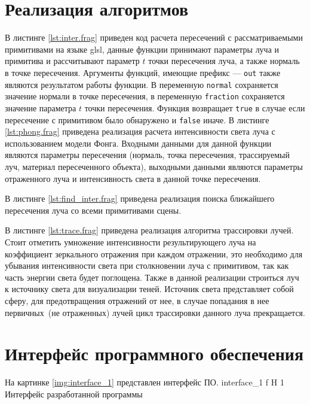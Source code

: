 \section{Реализация алгоритмов}
В листинге \ref{lst:inter.frag} приведен код расчета пересечений с рассматриваемыми примитивами на языке glsl, данные функции принимают
параметры луча и примитива  и рассчитывают параметр $t$ точки пересечения луча, а также нормаль   в точке пересечения.
Аргументы функций, имеющие префикс --- \texttt{out} также являются результатом работы функции.
В переменную \texttt{normal} сохраняется значение нормали в точке пересечения, в переменную \texttt{fraction} сохраняется 
значение параметра $t$ точки пересечения. Функция возвращает \texttt{true} в случае если пересечение с примитивом было обнаружено и \texttt{false}
иначе. 
В листинге \ref{lst:phong.frag} приведена реализация  расчета интенсивности света 
луча с использованием модели Фонга. Входными данными для данной функции являются параметры пересечения (нормаль, точка пересечения, трассируемый луч, 
материал пересеченного объекта), выходными данными являются параметры отраженного луча  и интенсивность света в данной точке пересечения.

В листинге \ref{lst:find_inter.frag} приведена реализация  поиска ближайшего пересечения луча со всеми  примитивами сцены.

В листинге \ref{lst:trace.frag}  приведена реализация алгоритма трассировки лучей. 
Стоит отметить умножение интенсивности результирующего луча на 
коэффициент зеркального отражения
при каждом отражении, это необходимо для убывания интенсивности света при  столкновении луча  с примитивом,
так как часть энергии света будет поглощена. Также в данной реализации строиться луч к источнику света для
визуализации теней. Источник света представляет собой сферу, для предотвращения отражений от нее, в случае попадания в нее первичных~(не отраженных)
лучей цикл трассировки данного луча прекращается.






\section{Интерфейс программного обеспечения}

На картинке \ref{img:interface_1} представлен интерфейс ПО.
{interface_1} %
{f} %
{H} %
{1\textwidth} %
{Интерфейс разработанной программы} %

